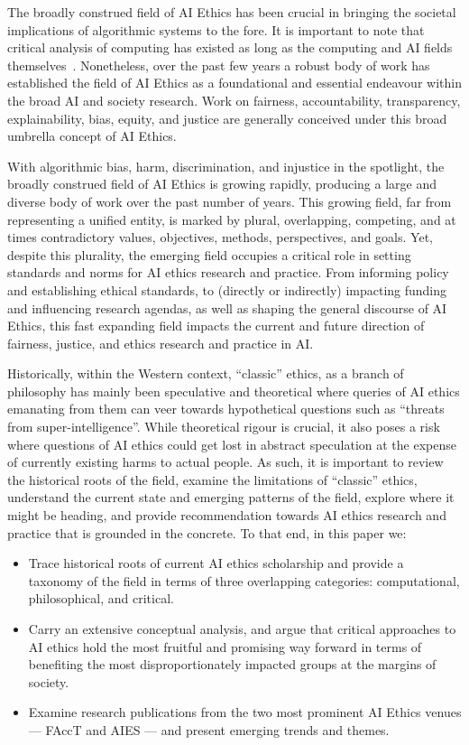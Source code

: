 \documentclass[manuscript]{acmart}
\begin{document}
The broadly construed field of AI Ethics has been crucial in bringing the societal implications of algorithmic systems to the fore. It is important to note that critical analysis of computing has existed as long as the computing and AI fields themselves~\cite{weizenbaum1976computer, dreyfus1972computers, winograd1986understanding, agre1994surveillance}. Nonetheless, over the past few years a robust body of work has established the field of AI Ethics as a foundational and essential endeavour within the broad AI and society research. 
Work on fairness, accountability, transparency, explainability, bias, equity, and justice are generally conceived under this broad umbrella concept of AI Ethics. 

With algorithmic bias, harm, discrimination, and injustice in the spotlight, the broadly construed field of AI Ethics is growing rapidly, producing a large and diverse body of work over the past number of years. This growing field, far from representing a unified entity, is marked by plural, overlapping, competing, and at times contradictory values, objectives, methods, perspectives, and goals. Yet, despite this plurality, the emerging field occupies a critical role in setting standards and norms for AI ethics research and practice. From informing policy and establishing ethical standards, to (directly or indirectly) impacting funding and influencing research agendas, as well as shaping the general discourse of AI Ethics, this fast expanding field impacts the current and future direction of fairness, justice, and ethics research and practice in AI. 

Historically, within the Western context, ``classic'' ethics, as a branch of philosophy has mainly been speculative and theoretical where queries of AI ethics emanating from them can veer towards hypothetical questions such as ``threats from super-intelligence''. While theoretical rigour is crucial, it also poses a risk where questions of AI ethics could get lost in abstract speculation at the expense of currently existing harms to actual people. As such, it is important to review the historical roots of the field, examine the limitations of ``classic'' ethics, understand the current state and emerging patterns of the field, explore where it might be heading, and provide recommendation towards AI ethics research and practice that is grounded in the concrete. To that end, in this paper we: 

\begin{itemize}
    \item Trace historical roots of current AI ethics scholarship and provide a taxonomy of the field in terms of three overlapping categories: computational, philosophical, and critical.
    \item Carry an extensive conceptual analysis, and argue that critical approaches to AI ethics hold the most fruitful and promising way forward in terms of benefiting the most disproportionately impacted groups at the margins of society.
    \item Examine research publications from the two most prominent AI Ethics venues --- FAccT and AIES --- and present emerging trends and themes. 
\end{itemize}
\end{document}
